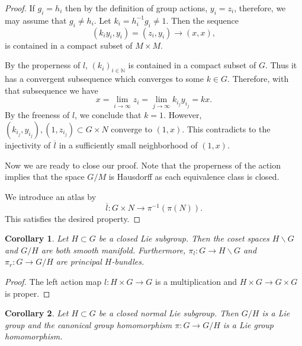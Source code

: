 \documentclass{article}
\newtheorem{corollary}{Corollary}[section]
\numberwithin{equation}{section}
\begin{document}
\begin{proof}
If $g_i=h_i$ then by the definition of group actions, $y_i=z_i$, therefore, we may assume that $g_i\not=h_i$. Let $k_i = h_i^{-1}g_i\not=1$. Then the sequence
\begin{equation*}
(k_iy_i,y_i) = (z_i,y_i)\to(x,x),
\end{equation*}
is contained in a compact subset of $M\times M$.\\ %
\par By the properness of $l$, $(k_i)_{i\in\mathbb{N}}$ is contained in a compact subset of $G$. Thus it has a convergent subsequence which converges to some $k\in G$. Therefore, with that subsequence we have
\begin{equation*}
x=\lim_{i\to\infty}z_i=\lim_{j\to\infty} k_{i_j}y_{i_j} = kx.
\end{equation*}
By the freeness of $l$, we conclude that $k=1$. However, $(k_{i_j},y_{i_j}),(1,z_{i_j})\subset G\times N$ converge to $(1,x)$. This contradicts to the injectivity of $\overline{l}$ in a sufficiently small neighborhood of $(1,x)$.\\%
\par Now we are ready to close our proof. Note that the properness of the action implies that the space $G/M$ is Hausdorff as each equivalence class is closed.\\%
\par We introduce an atlas by 
\begin{equation*}
\overline{l}:G\times N\to\pi^{-1}(\pi(N)).
\end{equation*}
This satisfies the desired property.%
\end{proof}

\begin{corollary}
Let $H\subset G$ be a closed Lie subgroup. Then the coset spaces $H\backslash G$ and $G/H$ are both smooth manifold. Furthermore, $\pi_l:G\to H\backslash G$ and $\pi_r:G\to G/H$ are principal $H$-bundles. %
\end{corollary}

\begin{proof}
The left action map $l:H\times G\to G$ is a multiplication and $H\times G\to G\times G$ is proper. %
\end{proof}

\begin{corollary}
Let $H\subset G$ be a closed normal Lie subgroup. Then $G/H$ is a Lie group and the canonical group homomorphism $\pi:G\to G/H$ is a Lie group homomorphism.
\end{corollary}
\end{document}
